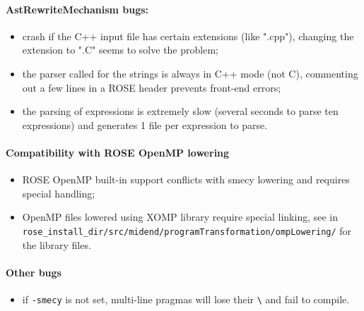 \documentclass[a4paper,11pt]{article}
\begin{document}
		\paragraph{AstRewriteMechanism bugs:}
		\begin{itemize}
			\item crash if the C++ input file has certain extensions (like ".cpp"), changing the extension to ".C" seems to solve the problem;
			\item the parser called for the strings is always in C++ mode (not C), commenting out a few lines in a ROSE header prevents front-end errors;
			\item the parsing of expressions is extremely slow (several seconds to parse ten expressions) and generates 1 file per expression to parse.
		\end{itemize}

		\paragraph{Compatibility with ROSE OpenMP lowering}
		\begin{itemize}
			\item ROSE OpenMP built-in support conflicts with smecy lowering and requires special handling;
			\item OpenMP files lowered using XOMP library require special linking, see in \verb+rose_install_dir/src/midend/programTransformation/ompLowering/+ for the library files.
		\end{itemize}

		\paragraph{Other bugs}
		\begin{itemize}
			\item if \verb+-smecy+ is not set, multi-line pragmas will lose their \verb+\+ and fail to compile.
		\end{itemize}

	
	
\end{document}
